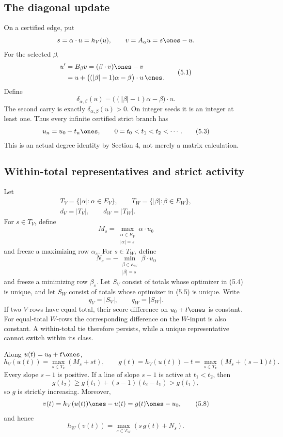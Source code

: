 \documentclass[11pt]{article}
\theoremstyle{definition}
\theoremstyle{remark}
\begin{document}
\subsection{The diagonal update}

On a certified edge, put
\[
 s=\alpha\cdot u=h_V(u),\qquad
 v=A_\alpha u=s\ones-u.
\]
For the selected \(\beta\),
\[
\begin{aligned}
u'&=B_\beta v
   =(\beta\cdot v)\ones-v\\
  &=u+\bigl((|\beta|-1)\alpha-\beta\bigr)\cdot u\,\ones.
\end{aligned}
\tag{5.1}
\]
Define
\[
 \delta_{\alpha,\beta}(u)
 =\bigl((|\beta|-1)\alpha-\beta\bigr)\cdot u.
\tag{5.2}
\]
The second carry is exactly \(\delta_{\alpha,\beta}(u)>0\).  On integer
seeds it is an integer at least one.  Thus every infinite certified strict
branch has
\[
 u_n=u_0+t_n\ones,\qquad 0=t_0<t_1<t_2<\cdots .
\tag{5.3}
\]
This is an actual degree identity by Section 4, not merely a matrix
calculation.

\subsection{Within-total representatives and strict activity}

Let
\[
 \begin{gathered}
 T_V=\{|\alpha|:\alpha\in E_V\},\qquad
 T_W=\{|\beta|:\beta\in E_W\},\\
 d_V=|T_V|,\qquad d_W=|T_W|.
 \end{gathered}
\]
For \(s\in T_V\), define
\[
 M_s=\max_{\substack{\alpha\in E_V\\|\alpha|=s}}
       \alpha\cdot u_0
\tag{5.4}
\]
and freeze a maximizing row \(\alpha_s\).  For \(s\in T_W\), define
\[
 N_s=-\min_{\substack{\beta\in E_W\\|\beta|=s}}
       \beta\cdot u_0
\tag{5.5}
\]
and freeze a minimizing row \(\beta_s\).  Let \(S_V\) consist of totals
whose optimizer in (5.4) is unique, and let \(S_W\) consist of totals whose
optimizer in (5.5) is unique.  Write
\[
 q_V=|S_V|,\qquad q_W=|S_W|.
\tag{5.6}
\]
If two \(V\)-rows have equal total, their score difference on
\(u_0+t\ones\) is constant.  For equal-total \(W\)-rows the corresponding
difference on the \(W\)-input is also constant.  A within-total tie
therefore persists, while a unique representative cannot switch within its
class.

Along \(u(t)=u_0+t\ones\),
\[
 h_V(u(t))=\max_{s\in T_V}(M_s+st),
\qquad
 g(t)=h_V(u(t))-t
     =\max_{s\in T_V}(M_s+(s-1)t).
\tag{5.7}
\]
Every slope \(s-1\) is positive.  If a line of slope \(s-1\) is active at
\(t_1<t_2\), then
\[
 g(t_2)\geq g(t_1)+(s-1)(t_2-t_1)>g(t_1),
\]
so \(g\) is strictly increasing.  Moreover,
\[
 v(t)=h_V(u(t))\ones-u(t)=g(t)\ones-u_0,
\tag{5.8}
\]
and hence
\[
 h_W(v(t))=\max_{s\in T_W}(s\,g(t)+N_s).
\tag{5.9}
\]
\end{document}
